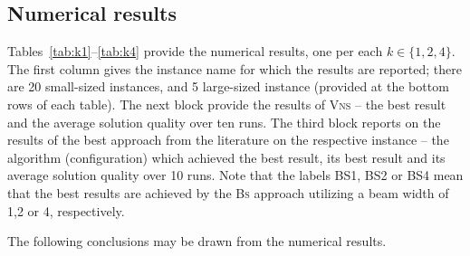 \documentclass[dvipsnames,format=sigconf,anonymous=true,review=true]{acmart}
\begin{document}
\subsection{Numerical results }
 Tables~\ref{tab:k1}--\ref{tab:k4} provide the numerical results, one per each $k \in \{1, 2,4\}$. The first column gives the instance name for which the results are reported; there are 20 small-sized instances, and 5 large-sized instance (provided at the   bottom rows of each table). The next block  provide the results of \textsc{Vns} -- the best result and the average solution quality over ten runs. The third block reports on the results of the best approach from the literature on the respective instance -- the algorithm (configuration) which achieved the best result, its best result  and its average solution quality over 10 runs. Note that the labels BS1, BS2 or BS4 mean  that the best results are achieved by the \textsc{Bs} approach  utilizing a beam width of 1,2 or 4, respectively. 
 
   The following conclusions may be drawn from the numerical results. 
   
\end{document}
